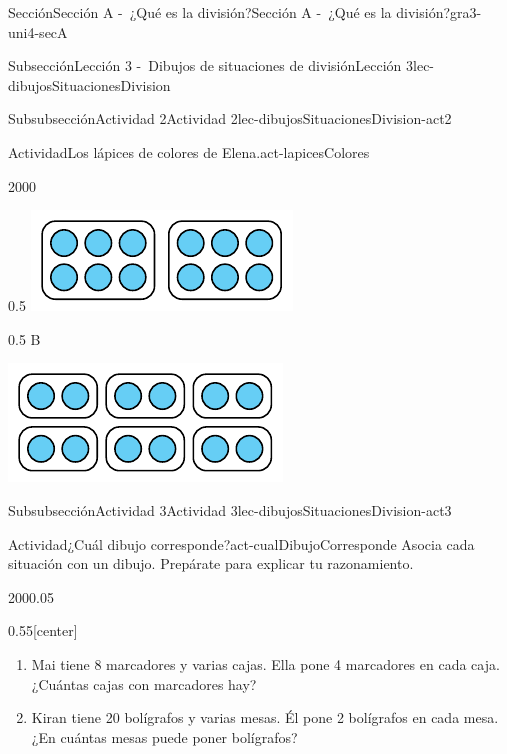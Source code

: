 \documentclass[twoside,10pt,]{article}
\begin{document}
\begin{sectionptx}{Sección}{Sección A -~¿Qué es la división?}{}{Sección A -~¿Qué es la división?}{}{}{gra3-uni4-secA}
\begin{subsectionptx}{Subsección}{Lección 3 -~Dibujos de situaciones de división}{}{Lección 3}{}{}{lec-dibujosSituacionesDivision}
\begin{subsubsectionptx}{Subsubsección}{Actividad 2}{}{Actividad 2}{}{}{lec-dibujosSituacionesDivision-act2}
\begin{activity}{Actividad}{Los lápices de colores de Elena.}{act-lapicesColores}
\begin{sidebyside}{2}{0}{0}{0}
\begin{sbspanel}{0.5}
\includegraphics[width=\linewidth]{external/tikz-source/tikz-file-149310.pdf}
\end{sbspanel}%
\begin{sbspanel}{0.5}%
B%
\par
\includegraphics[width=\linewidth]{external/tikz-source/tikz-file-149311.pdf}
\end{sbspanel}%
\end{sidebyside}%
\end{activity}%
\end{subsubsectionptx}
%
%
\typeout{************************************************}
\typeout{************************************************}
%
\begin{subsubsectionptx}{Subsubsección}{Actividad 3}{}{Actividad 3}{}{}{lec-dibujosSituacionesDivision-act3}
\begin{activity}{Actividad}{¿Cuál dibujo corresponde?}{act-cualDibujoCorresponde}%
Asocia cada situación con un dibujo. Prepárate para explicar tu razonamiento.%
\begin{sidebyside}{2}{0}{0}{0.05}%
\begin{sbspanel}{0.55}[center]%
%
\begin{enumerate}
\item{}Mai tiene 8 marcadores y varias cajas. Ella pone 4 marcadores en cada caja. ¿Cuántas cajas con marcadores hay?%
\item{}Kiran tiene 20 bolígrafos y varias mesas. Él pone 2 bolígrafos en cada mesa. ¿En cuántas mesas puede poner bolígrafos?%

\end{enumerate}
\end{sbspanel}
\end{sidebyside}
\end{activity}
\end{subsubsectionptx}
\end{subsectionptx}
\end{sectionptx}
\end{document}
